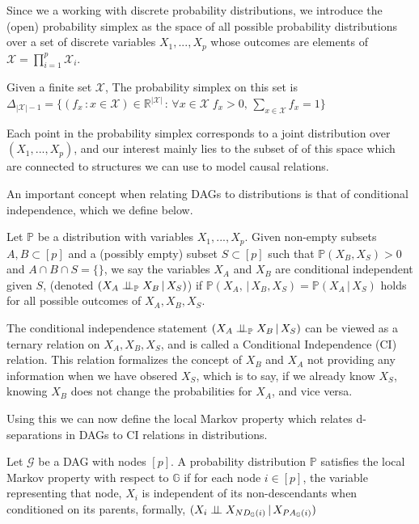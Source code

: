\documentclass{tufte-book}
\begin{document}
Since we a working with discrete probability distributions, we introduce the (open) probability simplex as the space of all possible probability distributions over a set of discrete variables \(X_1,...,X_p\) whose outcomes are elements of \(\mathcal{X}=\prod_{i=1}^p \mathcal{X}_i\).

\begin{definition}\label{probsimplex}
Given a finite set $\mathcal{X}$, The probability simplex on this set is \\ $\Delta_{|\mathcal{X}|-1} = \{ (f_x \, : x \in \mathcal{X}) \in \mathbb{R}^{|\mathcal{X}|} \, : \, \forall x \in \mathcal{X} \; f_x > 0, \, \sum_{x\in \mathcal{X}}f_x =1\} $
\end{definition}

Each point in the probability simplex corresponds to a joint distribution over \((X_1,...,X_p)\), and our interest mainly lies to the subset of of this space which are connected to structures we can use to model causal relations.


An important concept when relating DAGs to distributions is that of conditional independence, which we define below.
\begin{definition}\label{def:cirel}
Let  $\mathbb{P}$ be a distribution with variables $X_1,...,X_p$. Given non-empty subsets $A,B \subset [p]$ and a (possibly empty) subset $S \subset [p]$ such that $\mathbb{P}(X_B, X_S)>0$ and $A \cap B \cap S = \{\}$, we say the variables $X_A$ and $X_B$ are conditional independent given $S$, (denoted $(X_A\perp \!\!\! \perp_{\mathbb{P}} X_B \,|\, X_S)$) if $\mathbb{P}(X_A, \,|\,X_B, X_S) = \mathbb{P}(X_A \, |\, X_S)$ holds for all possible outcomes of $X_A,X_B,X_S$.
\end{definition}

The conditional independence statement \((X_A \perp \!\!\! \perp_{\mathbb{P}} X_B \,|\,X_S)\) can be viewed as a ternary relation on \(X_A,X_B,X_S\), and is called a Conditional Independence (CI) relation. This relation formalizes the concept of \(X_B\) and \(X_A\) not providing any information when we have obsered \(X_S\), which is to say, if we already know \(X_S\), knowing \(X_B\) does not change the probabilities for \(X_A\), and vice versa.


Using this we can now define the local Markov property which relates d-separations in DAGs to CI relations in distributions.

\begin{theorem}\label{thm:localmarkovdag}
Let $\mathcal{G}$ be a DAG with nodes $[p]$. A probability distribution $\mathbb{P}$ satisfies the local Markov property with respect to $\mathbb{G}$ if for each node $i \in [p]$, the variable representing that node, $X_i$ is independent of its non-descendants when conditioned on its parents, formally, $(X_i \perp \!\!\! \perp X_{ND_{\mathbb{G}}(i)}\,|\,X_{PA_{\mathbb{G}}(i)})$
\end{theorem}
\end{document}

